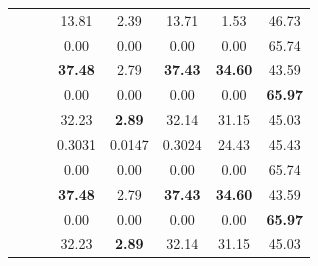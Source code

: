 \begin{table}[!ht]
\begin{tabular*}{\columnwidth}{@{\extracolsep{\fill}}cc l ccc cc}
&  
& \pipe{\query}\pipe{\nerOff}\pipe{\typeRaw}\pipe{\iconEye}{\iconEval} & 13.81 & 2.39 & 13.71 & 1.53 & 46.73 \\
& & \pipe{\query}\pipe{\nerOff}\pipe{\typeBBox}\pipe{\iconEye}{\iconEval} & 0.00 & 0.00 & 0.00 & 0.00 & 65.74 \\
& & \pipe{\query}\pipe{\nerOff}\pipe{\typeAttn}\pipe{\iconEye}{\iconEval} & \textbf{37.48} & 2.79 & \textbf{37.43} & \textbf{34.60} & 43.59 \\
& & \pipe{\query}\pipe{\nerOn}\pipe{\typeBBox}\pipe{\iconEye}{\iconEval} & 0.00 & 0.00 & 0.00 & 0.00 & \textbf{65.97} \\
& & \pipe{\query}\pipe{\nerOff}\pipe{\typeSeg}\pipe{\iconEye}{\iconEval} & 32.23 & \textbf{2.89} & 32.14 & 31.15 & 45.03 \\

\midrule

&  
& \pipe{\query}\pipe{\nerOff}\pipe{\typeRaw}\pipe{\iconEye}{\iconEval} & 0.3031 & 0.0147 & 0.3024 & 24.43 & 45.43 \\
& & \pipe{\query}\pipe{\nerOff}\pipe{\typeBBox}\pipe{\iconEye}{\iconEval} & 0.00 & 0.00 & 0.00 & 0.00 & 65.74 \\
& & \pipe{\query}\pipe{\nerOff}\pipe{\typeAttn}\pipe{\iconEye}{\iconEval} & \textbf{37.48} & 2.79 & \textbf{37.43} & \textbf{34.60} & 43.59 \\
& & \pipe{\query}\pipe{\nerOn}\pipe{\typeBBox}\pipe{\iconEye}{\iconEval} & 0.00 & 0.00 & 0.00 & 0.00 & \textbf{65.97} \\
& & \pipe{\query}\pipe{\nerOff}\pipe{\typeSeg}\pipe{\iconEye}{\iconEval} & 32.23 & \textbf{2.89} & 32.14 & 31.15 & 45.03 \\



\end{tabular*}
\end{table}
